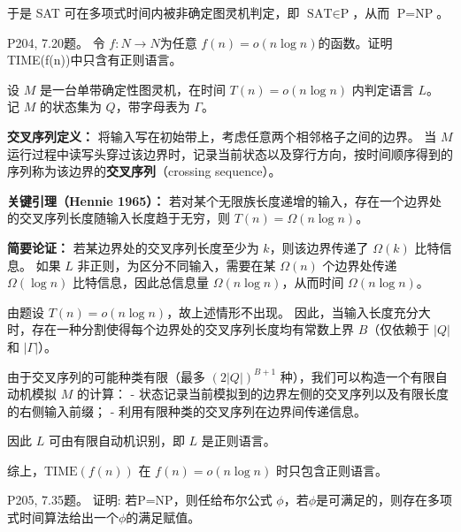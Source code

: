 \documentclass[11pt,addpoints,answers]{exam}
\begin{document}
\begin{questions}
\begin{solution}
    于是 SAT 可在多项式时间内被非确定图灵机判定，即 $\text{SAT} \in \text{P}$，从而 $\text{P} = \text{NP}$。
\end{solution}


\question P204, 7.20题。
令 $f:N\rightarrow N$为任意 $f(n)=o(n\log n)$的函数。证明 TIME(f(n))中只含有正则语言。
\begin{solution}

	设 \(M\) 是一台单带确定性图灵机，在时间 \(T(n) = o(n\log n)\) 内判定语言 \(L\)。  
    记 \(M\) 的状态集为 \(Q\)，带字母表为 \(\Gamma\)。
    
    \medskip
    
    \noindent
    \textbf{交叉序列定义：}  
    将输入写在初始带上，考虑任意两个相邻格子之间的边界。  
    当 \(M\) 运行过程中读写头穿过该边界时，记录当前状态以及穿行方向，按时间顺序得到的序列称为该边界的\textbf{交叉序列}（crossing sequence）。
    
    \medskip
    
    \noindent
    \textbf{关键引理（Hennie 1965）：}  
    若对某个无限族长度递增的输入，存在一个边界处的交叉序列长度随输入长度趋于无穷，则 \(T(n) = \Omega(n\log n)\)。
    
    \noindent
    \textbf{简要论证：}  
    若某边界处的交叉序列长度至少为 \(k\)，则该边界传递了 \(\Omega(k)\) 比特信息。  
    如果 \(L\) 非正则，为区分不同输入，需要在某 \(\Omega(n)\) 个边界处传递 \(\Omega(\log n)\) 比特信息，因此总信息量 \(\Omega(n\log n)\)，从而时间 \(\Omega(n\log n)\)。
    
    \medskip
    
    \noindent
    由题设 \(T(n) = o(n\log n)\)，故上述情形不出现。  
    因此，当输入长度充分大时，存在一种分割使得每个边界处的交叉序列长度均有常数上界 \(B\)（仅依赖于 \(|Q|\) 和 \(|\Gamma|\)）。  
    
    由于交叉序列的可能种类有限（最多 \((2|Q|)^{B+1}\) 种），我们可以构造一个有限自动机模拟 \(M\) 的计算：  
    - 状态记录当前模拟到的边界左侧的交叉序列以及有限长度的右侧输入前缀；  
    - 利用有限种类的交叉序列在边界间传递信息。  
    
    因此 \(L\) 可由有限自动机识别，即 \(L\) 是正则语言。
    
    \medskip
    
    \noindent
    综上，\(\mathrm{TIME}(f(n))\) 在 \(f(n) = o(n\log n)\) 时只包含正则语言。
\end{solution}

\question P205, 7.35题。
证明: 若P=NP，则任给布尔公式 $\phi$，若$\phi$是可满足的，则存在多项式时间算法给出一个$\phi$的满足赋值。
\begin{solution}


\end{solution}
\end{questions}
\end{document}
